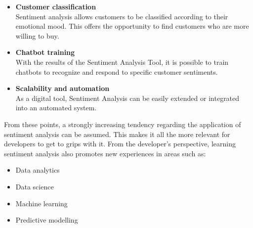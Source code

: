 \begin{itemize}
\item \textbf{Customer classification}\\
Sentiment analysis allows customers to be classified according to their emotional mood. This offers the opportunity to find customers who are more willing to buy.
\item \textbf{Chatbot training}\\
With the results of the Sentiment Analysis Tool, it is possible to train chatbots to recognize and respond to specific customer sentiments.
\item \textbf{Scalability and automation}\\
As a digital tool, Sentiment Analysis can be easily extended or integrated into an automated system.
\end{itemize}

From these points, a strongly increasing tendency regarding the application of sentiment analysis can be assumed. This makes it all the more relevant for developers to get to grips with it. From the developer's perspective, learning sentiment analysis also promotes new experiences in areas such as: 

\begin{itemize}
\item Data analytics
\item Data science
\item Machine learning
\item Predictive modelling
\end{itemize}

